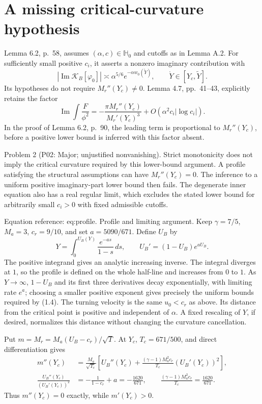 \documentclass[10pt]{article}
\begin{document}
\section*{A missing critical-curvature hypothesis}
Lemma 6.2, p. 58, assumes \((\alpha,c)\in\mathbb H_0\) and cutoffs as in Lemma A.2. For sufficiently small positive \(c_i\), it asserts a nonzero imaginary contribution with \[|\operatorname{Im}\mathcal K_B[\varphi_0]|
 \asymp \alpha^{5/6}e^{-\alpha w_0(\mathring Y)},
 \qquad \mathring Y\in[Y_c,\widetilde Y].\] Its hypotheses do not require \(M_r''(Y_c)\ne0\). Lemma 4.7, pp. 41–43, explicitly retains the factor \[\operatorname{Im}\int\frac{F}{\phi^2}
 =-\frac{\pi M_r''(Y_c)}{M_r'(Y_c)^3}
   +O(\alpha^2c_i|\log c_i|).\] In the proof of Lemma 6.2, p. 90, the leading term is proportional to \(M_r''(Y_c)\), before a positive lower bound is inferred with this factor absent.\par
Problem 2 (P02: Major; unjustified nonvanishing).  Strict monotonicity does not imply the critical curvature required by this lower-bound argument. A profile satisfying the structural assumptions can have \(M_r''(Y_c)=0\). The inference to a uniform positive imaginary-part lower bound then fails. The degenerate inner equation also has a real regular limit, which excludes the stated lower bound for arbitrarily small \(c_i>0\) with fixed admissible cutoffs.\par
Equation reference: eq:profile. Profile and limiting argument. Keep \(\gamma=7/5\), \(M_a=3\), \(c_r=9/10\), and set \(a=5090/671\). Define \(U_B\) by \[Y=\int_0^{U_B(Y)}\frac{e^{-as}}{1-s}\,ds,
 \qquad U_B'=(1-U_B)e^{aU_B}.
 \] The positive integrand gives an analytic increasing inverse. The integral diverges at \(1\), so the profile is defined on the whole half-line and increases from \(0\) to \(1\). As \(Y\to\infty\), \(1-U_B\) and its first three derivatives decay exponentially, with limiting rate \(e^a\); choosing a smaller positive exponent gives precisely the uniform bounds required by (1.4). The turning velocity is the same \(u_0<c_r\) as above. Its distance from the critical point is positive and independent of \(\alpha\). A fixed rescaling of \(Y\), if desired, normalizes this distance without changing the curvature cancellation.\par
Put \(m=M_r=M_a(U_B-c_r)/\sqrt T\). At \(Y_c\), \(T_c=671/500\), and direct differentiation gives \[\begin{aligned}
 m''(Y_c)
 &=\frac{M_a}{\sqrt{T_c}}\left[
 U_B''(Y_c)+
 \frac{(\gamma-1)M_a^2c_r}{T_c}(U_B'(Y_c))^2\right],\\
 \frac{U_B''(Y_c)}{(U_B'(Y_c))^2}
 &=-\frac1{1-c_r}+a=-\frac{1620}{671},
 \qquad
 \frac{(\gamma-1)M_a^2c_r}{T_c}=\frac{1620}{671}.\end{aligned}\] Thus \(m''(Y_c)=0\) exactly, while \(m'(Y_c)>0\).\par
\end{document}
